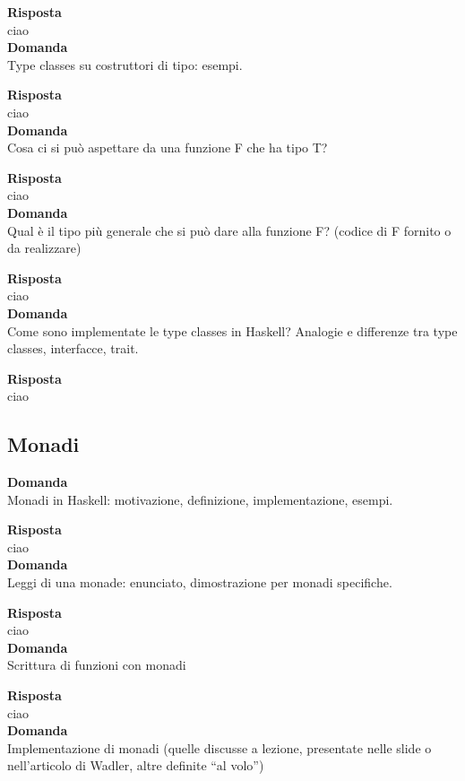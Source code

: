 \documentclass{article}
\begin{document}
\textbf{Risposta}\\
ciao
\vspace{14pt}\\
\textbf{Domanda}\\
Type classes su costruttori di tipo: esempi.

\textbf{Risposta}\\
ciao
\vspace{14pt}\\
\textbf{Domanda}\\
Cosa ci si può aspettare da una funzione F che ha tipo T?

\textbf{Risposta}\\
ciao
\vspace{14pt}\\
\textbf{Domanda}\\
Qual è il tipo più generale che si può dare alla funzione F? (codice di F fornito o da realizzare)

\textbf{Risposta}\\
ciao
\vspace{14pt}\\
\textbf{Domanda}\\
Come sono implementate le type classes in Haskell? Analogie e differenze tra type classes, interfacce, trait.

\textbf{Risposta}\\
ciao
\vspace{14pt}\\

\subsection*{Monadi}
\textbf{Domanda}\\
Monadi in Haskell: motivazione, definizione, implementazione, esempi.

\textbf{Risposta}\\
ciao
\vspace{14pt}\\
\textbf{Domanda}\\
Leggi di una monade: enunciato, dimostrazione per monadi specifiche.

\textbf{Risposta}\\
ciao
\vspace{14pt}\\
\textbf{Domanda}\\
Scrittura di funzioni con monadi

\textbf{Risposta}\\
ciao
\vspace{14pt}\\
\textbf{Domanda}\\
Implementazione di monadi (quelle discusse a lezione, presentate nelle slide o nell’articolo di Wadler, altre definite “al volo”)
\end{document}
